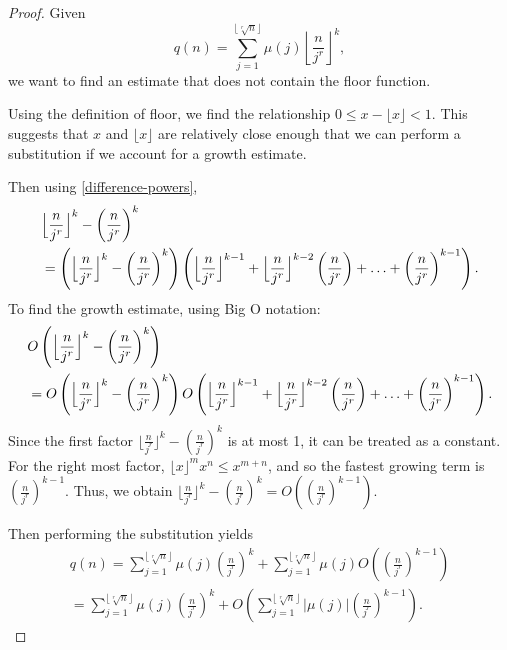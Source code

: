 \documentclass[10pt,a4paper]{article}
\theoremstyle{definition}
\theoremstyle{remark}
\begin{document}
\begin{proof}
	Given \begin{equation}
		q(n) = \sum_{j=1}^{\lfloor\sqrt[r]{n}\rfloor} \mu(j)\left\lfloor \frac{n}{j^r} \right\rfloor^k,
	\end{equation} we want to find an estimate that does not contain the floor function. 
	
	Using the definition of floor, we find the relationship \(0\leq x - \lfloor x \rfloor < 1\).
	This suggests that \(x\) and \(\lfloor x \rfloor\) are relatively close enough that we can perform a substitution if we account for a growth estimate. 
	
	Then using \cref{difference-powers}, 
	\begin{align}
		&\Bigl\lfloor \frac{n}{j^r}\Bigr\rfloor^k -\left(\frac{n}{j^r}\right)^k
		\\&=\left(\Bigl\lfloor \frac{n}{j^r}\Bigr\rfloor^k- \left(\frac{n}{j^r}\right)^k\right)\left(\Bigl\lfloor\frac{n}{j^r}\Bigr\rfloor^{k-1}+\Bigl\lfloor\frac{n}{j^r}\Bigr\rfloor^{k-2}\left(\frac{n}{j^r}\right)+\mathellipsis+\left(\frac{n}{j^r}\right)^{k-1}\right).
	\end{align}
	To find the growth estimate, using Big O notation:
		\begin{align}
		&O\left(\Bigl\lfloor \frac{n}{j^r}\Bigr\rfloor^k -\left(\frac{n}{j^r}\right)^k \right)
		\\&=O\left(\Bigl\lfloor \frac{n}{j^r}\Bigr\rfloor^k- \left(\frac{n}{j^r}\right)^k\right)O\left(\Bigl\lfloor\frac{n}{j^r}\Bigr\rfloor^{k-1}+\Bigl\lfloor\frac{n}{j^r}\Bigr\rfloor^{k-2}\left(\frac{n}{j^r}\right)+\mathellipsis+\left(\frac{n}{j^r}\right)^{k-1}\right).
	\end{align}
	Since the first factor \(\lfloor \frac{n}{j^r}\rfloor^k- (\frac{n}{j^r})^k\) is at most 1, it can be treated as a constant. For the right most factor, \(\lfloor x \rfloor^mx^n\leq x^{m+n}\), and so the fastest growing term is  \(\left(\frac{n}{j^r}\right)^{k-1}\). Thus, we obtain $\lfloor \frac{n}{j^r}\rfloor^k - (\frac{n}{j^r})^k = O((\frac{n}{j^r})^{k-1})$. 
	
	Then performing the substitution yields
	\begin{multline}
	 q(n)=\sum_{j=1}^{\lfloor\sqrt[r]{n}\rfloor}\mu(j)\left(\frac{n}{j^r}\right)^k+\sum_{j=1}^{\lfloor\sqrt[r]{n}\rfloor}\mu(j)O\left(\left(\frac{n}{j^r}\right)^{k-1}\right)\\
	 =\sum_{j=1}^{\lfloor\sqrt[r]{n}\rfloor}\mu(j)\left(\frac{n}{j^r}\right)^k+O\left(\sum_{j=1}^{\lfloor\sqrt[r]{n}\rfloor}|\mu(j)|\left(\frac{n}{j^r}\right)^{k-1}\right).  \label{two_estimates}
	\end{multline}
	

\end{proof}
\end{document}
